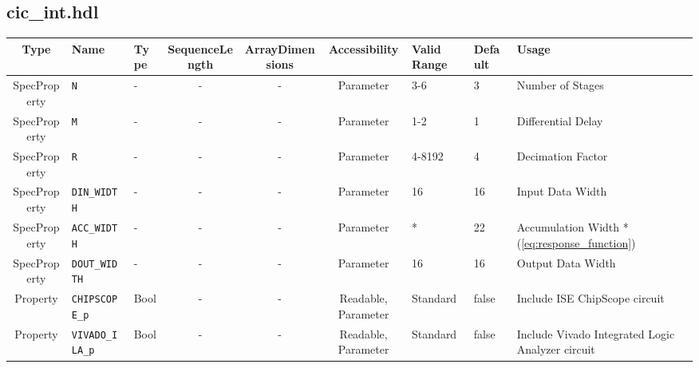 \documentclass{article}
\def\comp{cic\_int}
\begin{document}
\begin{landscape}
	\subsection*{\comp.hdl}
	\begin{scriptsize}
		\begin{tabular}{|c|p{2cm}|p{1cm}|c|c|c|p{2cm}|p{1cm}|p{5cm}|}
			\hline
			\rowcolor{blue}
			Type         & Name              & Type & SequenceLength & ArrayDimensions & Accessibility & Valid Range & Default & Usage                                            \\
			\hline
			SpecProperty & \verb+N+          & -    & -              & -               & Parameter     & 3-6         & 3       & Number of Stages                                 \\
			\hline
			SpecProperty & \verb+M+          & -    & -              & -               & Parameter     & 1-2         & 1       & Differential Delay                               \\
			\hline
			SpecProperty & \verb+R+          & -    & -              & -               & Parameter     & 4-8192      & 4       & Decimation Factor                                \\
			\hline
			SpecProperty & \verb+DIN_WIDTH+  & -    & -              & -               & Parameter     & 16          & 16      & Input Data Width                                 \\
			\hline
			SpecProperty & \verb+ACC_WIDTH+  & -    & -              & -               & Parameter     & *           & 22      & Accumulation Width *(\ref{eq:response_function}) \\
			\hline
			SpecProperty & \verb+DOUT_WIDTH+  & -    & -              & -               & Parameter           & 16          & 16      & Output Data Width                                \\
			\hline
			Property     & \verb+CHIPSCOPE_p+ & Bool & -              & -               & Readable, Parameter & Standard    & false   & Include ISE ChipScope circuit                        \\
			\hline
			Property     & \verb+VIVADO_ILA_p+ & Bool & -              & -               & Readable, Parameter & Standard    & false   & Include Vivado Integrated Logic Analyzer circuit                        \\
			\hline
		\end{tabular}
	\end{scriptsize}


\end{landscape}
\end{document}
